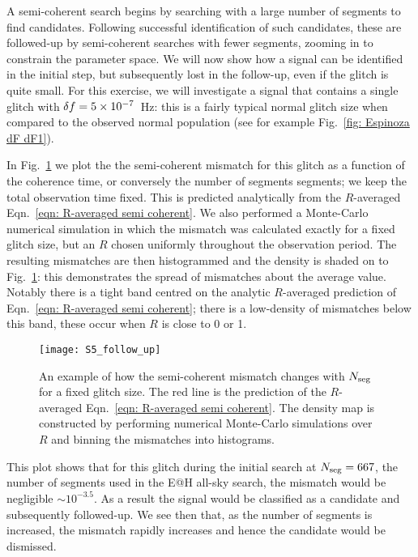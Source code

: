 \documentclass[../full_thesis/full_thesis.tex]{subfiles}
\begin{document}
A semi-coherent search begins by searching with a large number of segments to
find candidates. Following successful identification of such candidates, these
are followed-up by semi-coherent searches with fewer segments, zooming in to
constrain the parameter space. We will now show how a signal can
be identified in the initial step, but subsequently lost in the follow-up, even
if the glitch is quite small. For this exercise, we will investigate a signal
that contains a single glitch with $\delta f=5\times10^{-7}$~Hz: this is a
fairly typical normal glitch size when compared to the observed normal population (see for
example Fig.~\ref{fig: Espinoza dF dF1}).

In Fig.~\ref{fig: follow-up} we plot the the semi-coherent mismatch for this
glitch as a function of the coherence time, or conversely the number of
segments segments; we keep the total observation time fixed. This is predicted
analytically from the $R$-averaged Eqn.~\eqref{eqn: R-averaged semi coherent}.
We also performed a Monte-Carlo numerical simulation in which the mismatch was
calculated exactly for a fixed glitch size, but an $R$ chosen uniformly
throughout the observation period. The resulting mismatches are then histogrammed and the
density is shaded on to Fig.~\ref{fig: follow-up}: this demonstrates the spread of
mismatches about the average value. Notably there is a tight band centred on
the analytic $R$-averaged prediction of Eqn.~\eqref{eqn: R-averaged semi coherent};
there is a low-density of mismatches below this band, these occur when $R$ is
close to 0 or 1.

\begin{figure}[htb]
\centering
\texttt{[image: S5\_follow\_up]}
\caption{An example of how the semi-coherent mismatch changes with $N_{\textrm{seg}}$ for
         a fixed glitch size. The red line is the prediction of the $R$-averaged
         Eqn.~\eqref{eqn: R-averaged semi coherent}. The density map is constructed
         by performing numerical Monte-Carlo simulations over $R$ and binning the mismatches
         into histograms.}
\label{fig: follow-up}
\end{figure}
This plot shows that for this glitch during the initial search at $N_{\textrm{seg}}=667$,
the number of segments used in the E@H all-sky search, the mismatch would be
negligible $\sim10^{-3.5}$. As a result the signal would be classified as a
candidate and subsequently followed-up. We see then that, as the number of
segments is increased, the mismatch rapidly increases and hence the candidate
would be dismissed.
\end{document}
